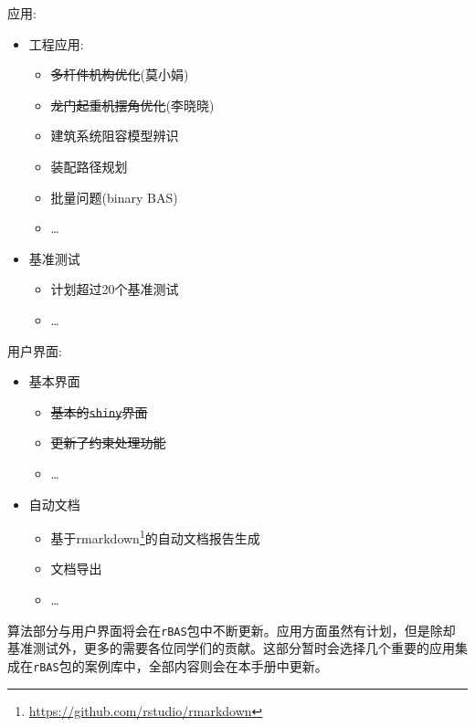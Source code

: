 \documentclass[]{ctexbook}
\providecommand{\tightlist}{%
  \setlength{\itemsep}{0pt}\setlength{\parskip}{0pt}}
\renewcommand{\href}[2]{#2\footnote{\url{#1}}}
\begin{document}
应用:

\begin{itemize}
\tightlist
\item
  工程应用:

  \begin{itemize}
  \tightlist
  \item
    \sout{多杆件机构优化}(莫小娟)
  \item
    \sout{龙门起重机摆角优化}(李晓晓)
  \item
    建筑系统阻容模型辨识
  \item
    装配路径规划
  \item
    批量问题(binary BAS)
  \item
    \ldots{}
  \end{itemize}
\item
  基准测试

  \begin{itemize}
  \tightlist
  \item
    计划超过20个基准测试
  \item
    \ldots{}
  \end{itemize}
\end{itemize}

用户界面:

\begin{itemize}
\tightlist
\item
  基本界面

  \begin{itemize}
  \tightlist
  \item
    \sout{基本的\texttt{shiny}界面}
  \item
    \sout{更新了约束处理功能}
  \item
    \ldots{}
  \end{itemize}
\item
  自动文档

  \begin{itemize}
  \tightlist
  \item
    基于\href{https://github.com/rstudio/rmarkdown}{rmarkdown}的自动文档报告生成
  \item
    文档导出
  \item
    \ldots{}
  \end{itemize}
\end{itemize}

算法部分与用户界面将会在\texttt{rBAS}包中不断更新。应用方面虽然有计划，但是除却基准测试外，更多的需要各位同学们的贡献。这部分暂时会选择几个重要的应用集成在\texttt{rBAS}包的案例库中，全部内容则会在本手册中更新。
\end{document}
